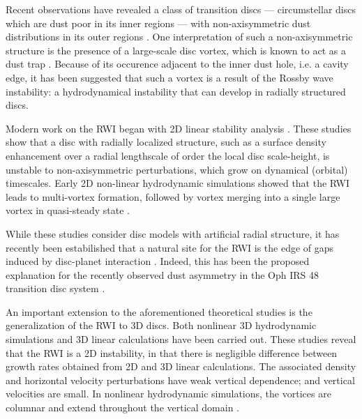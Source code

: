 \documentclass[useAMS,usenatbib]{mn2e}
\begin{document}

Recent observations have revealed a class of transition discs ---
circumstellar discs which are dust poor in its inner regions ---  
with non-axisymmetric dust distributions in its outer 
regions \citep{brown09,mayama12,marel13}. 
One interpretation of such a non-axisymmetric structure is the presence of
a large-scale disc vortex, which is known to act as a dust trap
\citep{barge95,inaba06,birnstiel13,ataiee13}.  
Because of its occurence adjacent to the inner dust
hole, i.e. a cavity edge, it has been suggested that such a vortex is
a result of the Rossby wave instability: a hydrodynamical instability
that can develop in radially structured discs.  

Modern work on the RWI began with 2D linear stability analysis
\citep{lovelace99,li00}. These studies show that a disc with radially localized
structure, such as a surface density enhancement over a
radial lengthscale of order the local disc scale-height, is unstable to
non-axisymmetric perturbations, which grow on dynamical (orbital)
timescales. Early 2D non-linear hydrodynamic simulations showed that
the RWI leads to multi-vortex formation, followed by vortex merging into
a single large vortex in quasi-steady state \citep{li01,inaba06}. 

While these studies consider disc models with artificial radial
structure, it has recently been estabilished that a natural site for
the RWI is the edge of gaps induced by disc-planet interaction 
\citep{koller03,li05,valborro07,li09,lyra09b,lin10,lin11a}. Indeed, this has
been the proposed explanation for the recently observed dust asymmetry
in the Oph IRS 48 transition disc system \citep{marel13}.      

An important extension to the aforementioned theoretical studies is
the generalization of the RWI to 3D 
discs. Both nonlinear 3D hydrodynamic simulations 
\citep{meheut10,meheut12b,lin12b} and 3D linear calculations
\citep{umurhan10,meheut12,lin12,lin13} have been carried out. 
These studies reveal that the RWI is a 2D instability,
in that there is negligible difference between growth rates obtained
from 2D and 3D linear calculations. The associated density and
horizontal velocity perturbations have weak vertical dependence; and
vertical velocities are small. In nonlinear hydrodynamic simulations,
the vortices are columnar and extend throughout the vertical domain
\citep{richard13}. 
\end{document}
